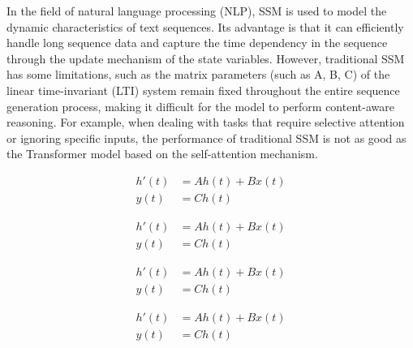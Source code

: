 \documentclass{article}
\theoremstyle{plain}
\theoremstyle{definition}
\theoremstyle{remark}
\begin{document}
In the field of natural language processing (NLP), SSM is used to model the dynamic characteristics of text sequences. Its advantage is that it can efficiently handle long sequence data and capture the time dependency in the sequence through the update mechanism of the state variables. However, traditional SSM has some limitations, such as the matrix parameters (such as A, B, C) of the linear time-invariant (LTI) system remain fixed throughout the entire sequence generation process, making it difficult for the model to perform content-aware reasoning. For example, when dealing with tasks that require selective attention or ignoring specific inputs, the performance of traditional SSM is not as good as the Transformer model based on the self-attention mechanism.

\noindent
\begin{minipage}{0.48\textwidth}
\small
\begin{align}
   h'(t) &= A h(t) + B x(t) \\
   y(t) &= C h(t)
\end{align}
\end{minipage}
\begin{minipage}{0.48\textwidth}
\small
\begin{align}
   h'(t) &= A h(t) + B x(t) \\
   y(t) &= C h(t)
\end{align}
\end{minipage}

\noindent
\begin{minipage}{0.48\textwidth}
\small
\begin{align}
   h'(t) &= A h(t) + B x(t) \\
   y(t) &= C h(t)
\end{align}
\end{minipage}
\begin{minipage}{0.48\textwidth}
\small
\begin{align}
   h'(t) &= A h(t) + B x(t) \\
   y(t) &= C h(t)
\end{align}
\end{minipage}
\end{document}
